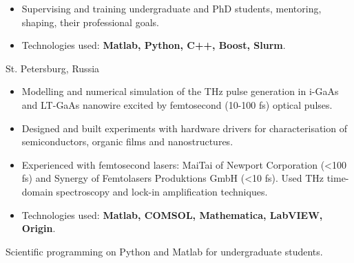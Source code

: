 \documentclass[10pt,a4paper,ragged2e,withhyper]{altacv}
\begin{document}
\begin{paracol}{2}
\begin{itemize}
    \item
    Supervising and training undergraduate and PhD students, mentoring, shaping,
    their professional goals.

    \item
    Technologies used: {\bf Matlab, Python, C++, Boost, Slurm}.

\end{itemize}

\divider

{St. Petersburg, Russia}

\begin{itemize}

    \item
    Modelling and numerical simulation of the THz pulse generation in i-GaAs
    and LT-GaAs nanowire excited by femtosecond (10-100 fs) optical pulses.

    \item
    Designed and built experiments with hardware drivers for
    characterisation of semiconductors, organic films and nanostructures.
    
    \item
    Experienced with femtosecond lasers: MaiTai of Newport Corporation (<100 fs)
    and Synergy of Femtolasers Produktions GmbH (<10 fs).
    Used THz time-domain spectroscopy and lock-in amplification techniques.

    \item
    Technologies used: {\bf Matlab, COMSOL, Mathematica, LabVIEW, Origin}.

\end{itemize}



Scientific programming on Python and Matlab for undergraduate students.





\divider


\end{paracol}
\end{document}
